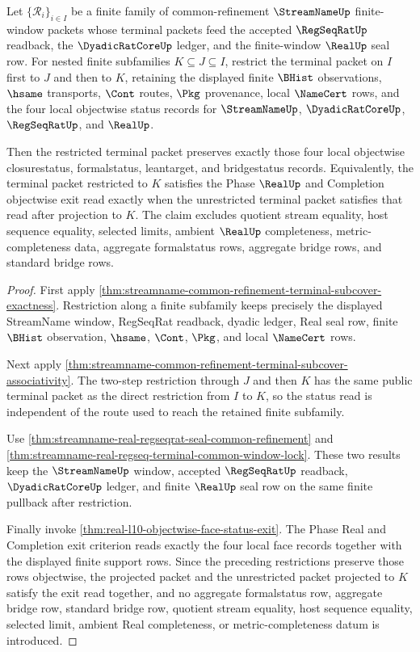 \begin{theorem}
\label{thm:streamname-common-refinement-objectwise-status-stability}
Let $\{\mathcal R_i\}_{i \in I}$ be a finite family of common-refinement $\StreamNameUp$ finite-window packets whose terminal packets feed the accepted $\RegSeqRatUp$ readback, the $\DyadicRatCoreUp$ ledger, and the finite-window $\RealUp$ seal row. For nested finite subfamilies $K \subseteq J \subseteq I$, restrict the terminal packet on $I$ first to $J$ and then to $K$, retaining the displayed finite $\BHist$ observations, $\hsame$ transports, $\Cont$ routes, $\Pkg$ provenance, local $\NameCert$ rows, and the four local objectwise status records for $\StreamNameUp$, $\DyadicRatCoreUp$, $\RegSeqRatUp$, and $\RealUp$.

Then the restricted terminal packet preserves exactly those four local objectwise closurestatus, formalstatus, leantarget, and bridgestatus records. Equivalently, the terminal packet restricted to $K$ satisfies the Phase $\RealUp$ and Completion objectwise exit read exactly when the unrestricted terminal packet satisfies that read after projection to $K$. The claim excludes quotient stream equality, host sequence equality, selected limits, ambient $\RealUp$ completeness, metric-completeness data, aggregate formalstatus rows, aggregate bridge rows, and standard bridge rows.
\end{theorem}
\begin{proof}
First apply \autoref{thm:streamname-common-refinement-terminal-subcover-exactness}. Restriction along a finite subfamily keeps precisely the displayed StreamName window, RegSeqRat readback, dyadic ledger, Real seal row, finite $\BHist$ observation, $\hsame$, $\Cont$, $\Pkg$, and local $\NameCert$ rows.

Next apply \autoref{thm:streamname-common-refinement-terminal-subcover-associativity}. The two-step restriction through $J$ and then $K$ has the same public terminal packet as the direct restriction from $I$ to $K$, so the status read is independent of the route used to reach the retained finite subfamily.

Use \autoref{thm:streamname-real-regseqrat-seal-common-refinement} and \autoref{thm:streamname-real-regseq-terminal-common-window-lock}. These two results keep the $\StreamNameUp$ window, accepted $\RegSeqRatUp$ readback, $\DyadicRatCoreUp$ ledger, and finite $\RealUp$ seal row on the same finite pullback after restriction.

Finally invoke \autoref{thm:real-l10-objectwise-face-status-exit}. The Phase Real and Completion exit criterion reads exactly the four local face records together with the displayed finite support rows. Since the preceding restrictions preserve those rows objectwise, the projected packet and the unrestricted packet projected to $K$ satisfy the exit read together, and no aggregate formalstatus row, aggregate bridge row, standard bridge row, quotient stream equality, host sequence equality, selected limit, ambient Real completeness, or metric-completeness datum is introduced.
\end{proof}

